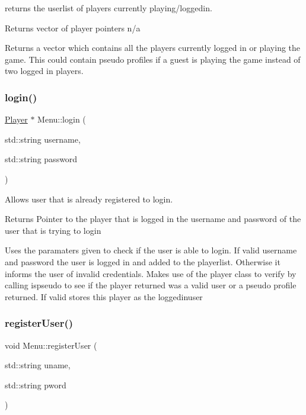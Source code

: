 returns the userlist of players currently playing/loggedin. 

\begin{DoxyReturn}{Returns}
vector of player pointers  n/a
\end{DoxyReturn}
Returns a vector which contains all the players currently logged in or playing the game. This could contain pseudo profiles if a guest is playing the game instead of two logged in players. \mbox{\label{classMenu_a5b7acd7315b89b7db11e0791ef6edc44}} 
\subsubsection{\texorpdfstring{login()}{login()}}
{\footnotesize\ttfamily \hyperlink{classPlayer}{Player} $\ast$ Menu\+::login (\begin{DoxyParamCaption}\item[{std\+::string}]{username,  }\item[{std\+::string}]{password }\end{DoxyParamCaption})}



Allows user that is already registered to login. 

\begin{DoxyReturn}{Returns}
Pointer to the player that is logged in  the username and password of the user that is trying to login
\end{DoxyReturn}
Uses the paramaters given to check if the user is able to login. If valid username and password the user is logged in and added to the playerlist. Otherwise it informs the user of invalid credentials. Makes use of the player class to verify by calling ispseudo to see if the player returned was a valid user or a pseudo profile returned. If valid stores this player as the loggedinuser \mbox{\label{classMenu_ab9be630400e32b048b2f48ebcbc6303e}} 
\subsubsection{\texorpdfstring{register\+User()}{registerUser()}}
{\footnotesize\ttfamily void Menu\+::register\+User (\begin{DoxyParamCaption}\item[{std\+::string}]{uname,  }\item[{std\+::string}]{pword }\end{DoxyParamCaption})}



